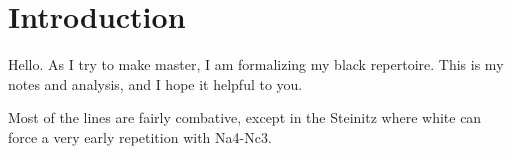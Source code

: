 \documentclass{article}
\begin{document}
\section{Introduction}
Hello. As I try to make master, I am formalizing my black repertoire.
This is my notes and analysis, and I hope it helpful to you.

Most of the lines are fairly combative, except in the Steinitz where white can 
force a very early repetition with Na4-\>Nc3.

\tableofcontents





\end{document}
